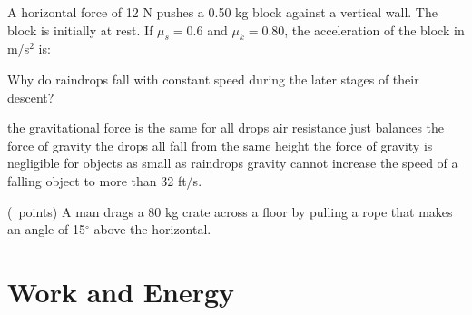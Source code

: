 \begin{questions}
  \question[2] A horizontal force of 12 N pushes a 0.50 kg block
  against a vertical wall. The block is initially at rest. If $\mu_s =
  0.6$ and $\mu_k = 0.80$, the acceleration of the block in m/s$^2$
  is:
  \begin{oneparchoices}
  \end{oneparchoices}

  \question[2] Why do raindrops fall with constant speed during the
  later stages of their descent?
  \begin{oneparchoices}
    \choice the gravitational force is the same for all drops
    \CorrectChoice air resistance just balances the force of gravity
    \choice the drops all fall from the same height
    \choice the force of gravity is negligible for objects as small as
    raindrops
    \choice gravity cannot increase the speed of a falling object to
    more than 32 ft/s.
  \end{oneparchoices}

  \question (\totalpoints\ points) A man drags a 80 kg crate across a
  floor by pulling a rope that makes an angle of 15$^\circ$ above the
  horizontal.
  
  \section{Work and Energy}


\end{questions}
